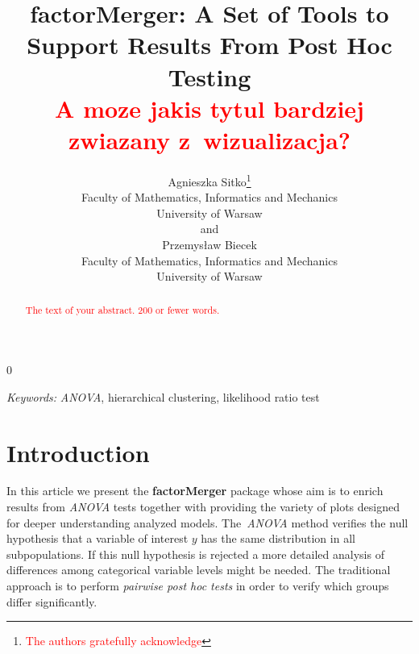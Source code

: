 \documentclass[12pt]{article}
\newcommand{\blind}{0}
\newcommand{\factorMerger}{\textbf{factorMerger }}
\newcommand{\todo}{\textcolor{red}}
\begin{document}
%

\def\spacingset#1{\renewcommand{\baselinestretch}%
{#1}\small\normalsize} \spacingset{1}



\blind
{
  \title{\bf factorMerger: A Set of Tools to Support
  	Results From Post Hoc Testing \\
  	\todo{A moze jakis tytul bardziej 
  	zwiazany z~wizualizacja?}}
  \author{Agnieszka Sitko\thanks{
    \todo{The authors gratefully acknowledge}}\hspace{.2cm}\\
    Faculty of Mathematics,  
    Informatics and Mechanics \\
    University of Warsaw\\
    and \\
    Przemys\l{}aw Biecek \\
    Faculty of Mathematics,  
    Informatics and Mechanics \\
    University of Warsaw}
  \maketitle
} \fi

\bigskip
\begin{abstract}
\todo{The text of your abstract.  200 or fewer words.}
\end{abstract}

\noindent%
{\it Keywords:}  \textit{ANOVA}, hierarchical clustering, likelihood ratio test 
\vfill

\newpage
\spacingset{1.45} %
\section{Introduction}
\label{sec:intro}

In this article we present the \factorMerger package whose aim is to enrich results from \emph{ANOVA} tests together with providing the variety of plots designed for deeper understanding analyzed models. The~\emph{ANOVA} method verifies the null hypothesis that a variable of interest $y$ has the same distribution in all subpopulations.
If this null hypothesis is rejected a more detailed analysis of differences among categorical variable levels might be needed. The traditional approach is to perform \emph{pairwise post hoc tests} in order to verify which groups differ significantly. 
\end{document}

